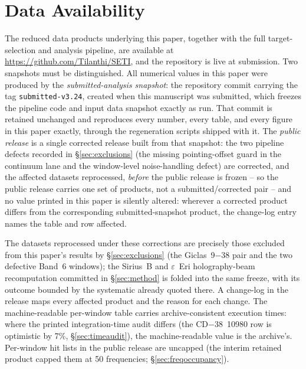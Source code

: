 \documentclass{openjournal}
\begin{document}
\section*{Data Availability}
The reduced data products underlying this paper, together with the full
target-selection and analysis pipeline, are available at
\url{https://github.com/Tilanthi/SETI}, and the repository is live at
submission. Two snapshots must be distinguished. All numerical values
in this paper were produced by the \emph{submitted-analysis snapshot}:
the repository commit carrying the tag \texttt{submitted-v3.24},
created when this manuscript was submitted, which freezes the pipeline
code and input data snapshot exactly as run. That commit is retained
unchanged and reproduces every number, every table, and every figure in
this paper exactly, through the regeneration scripts shipped with it.
The \emph{public release} is a single corrected release built from that
snapshot: the two pipeline defects recorded in \S\ref{sec:exclusions}
(the missing pointing-offset guard in the continuum lane and the
window-level noise-handling defect) are corrected, and the affected
datasets reprocessed, \emph{before} the public release is frozen -- so the
public release carries one set of products, not a
submitted/corrected pair -- and no value printed in this paper
is silently altered: wherever a corrected product differs from the
corresponding submitted-snapshot product, the change-log entry names
the table and row affected.

The datasets reprocessed under these
corrections are precisely those excluded from this paper's results by
\S\ref{sec:exclusions} (the Giclas~9$-$38 pair and the two defective
Band~6 windows); the Sirius~B and $\varepsilon$~Eri
holography-beam recomputation committed in \S\ref{sec:method} is folded
into the same freeze, with its outcome bounded by the systematic
already quoted there. A change-log in the release maps every affected
product and the reason for each change. The machine-readable per-window
table carries archive-consistent execution times: where the printed
integration-time audit differs (the CD$-$38~10980 row is optimistic by
7\%, \S\ref{sec:timeaudit}), the machine-readable value is the
archive's. Per-window hit lists in the public release are uncapped
(the interim retained product capped them at 50 frequencies;
\S\ref{sec:freqoccupancy}).
\end{document}
